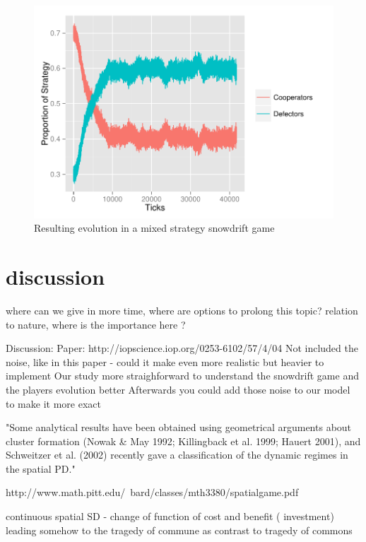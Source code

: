 \documentclass[DIV=calc, paper=a4, fontsize=11pt, twocolumn]{scrartcl}	 %
\begin{document}
\begin{figure}[here]
  \centering
  \includegraphics[width=1\linewidth]{task3}
 \caption{Resulting evolution in a mixed strategy snowdrift game}
\label{fig:task3}
\end{figure}

\section*{discussion}



where can we give in more time, where are options to prolong this topic? relation to nature, where is the importance here ? 

Discussion: 
Paper: http://iopscience.iop.org/0253-6102/57/4/04
Not included the noise, like in this paper  - could it make even more realistic but heavier to implement
Our study more straighforward to understand the snowdrift game and the players evolution better
Afterwards you could add those noise to our model to make it more exact

"Some analytical results have been obtained using geometrical arguments about cluster formation (Nowak \& May 1992; Killingback et al. 1999; Hauert 2001), and Schweitzer et al. (2002) recently gave a classification of the dynamic regimes in the spatial PD."

http://www.math.pitt.edu/~bard/classes/mth3380/spatialgame.pdf

continuous spatial SD - change of function of cost and benefit ( investment) leading somehow to the tragedy of commune as contrast to tragedy of commons 
\end{document}
